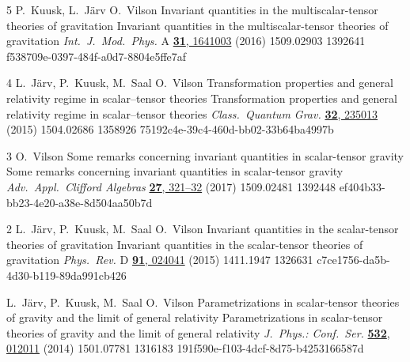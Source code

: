 
\lisaArtikkel%
	{5}%
	{P.\ Kuusk, L.\ J\"arv \ja{} O.\ Vilson}%
	{Invariant quantities in the multiscalar-tensor theories of gravitation}%
	{Invariant quantities in the multiscalar-tensor theories of gravitation}%
	{\textit{Int.\ J.\ Mod.\ Phys.} A \href{http://dx.doi.org/10.1142/S0217751X16410037}{{\bf 31}, 1641003} (2016)}%
	{1509.02903}%
	{1392641}%
	{f538709e-0397-484f-a0d7-8804e5ffe7af} %


\lisaArtikkel%
	{4}%
	{L.\ J\"arv, P.\ Kuusk, M.\ Saal \ja{} O.\ Vilson}%
	{Transformation properties and general relativity regime in scalar–tensor theories}%
	{Transformation properties and general relativity regime in scalar–tensor theories}%
	{\textit{Class.\ Quantum Grav.} \href{https://doi.org/10.1088/0264-9381/32/23/235013}{{\bf 32}, 235013} (2015)}%
	{1504.02686}%
	{1358926}%
	{75192c4e-39c4-460d-bb02-33b64ba4997b} %


\lisaArtikkel%
	{3}%
	{O.\ Vilson}%
	{Some remarks concerning invariant quantities in scalar-tensor gravity}%
	{Some remarks concerning invariant quantities in scalar-tensor gravity}%
	{\textit{Adv.\ Appl.\ Clifford Algebras} 	\href{https://doi.org/10.1007/s00006-015-0567-4}{{\bf 27}, 321--32} (2017)}%
	{1509.02481}%
	{1392448}%
	{ef404b33-bb23-4e20-a38e-8d504aa50b7d} %


\lisaArtikkel%
	{2}%
	{L.\ J\"arv, P.\ Kuusk, M.\ Saal \ja{} O.\ Vilson}%
	{Invariant quantities in the scalar-tensor theories of gravitation}%
	{Invariant quantities in the scalar-tensor theories of gravitation}%
	{\textit{Phys.\ Rev.} D \href{https://doi.org/10.1103/PhysRevD.91.024041}{{\bf 91}, 024041} (2015)}%
	{1411.1947}%
	{1326631}%
	{c7ce1756-da5b-4d30-b119-89da991cb426} %


	{L.\ J\"arv, P.\ Kuusk, M.\ Saal \ja{} O.\ Vilson}%
	{Parametrizations in scalar-tensor theories of gravity and the limit of general relativity}%
	{Parametrizations in scalar-tensor theories of gravity and the limit of general relativity}%
	{\textit{J.\ Phys.: Conf.\ Ser.} \href{https://doi.org/10.1088/1742-6596/532/1/012011}{{\bf 532}, 012011} (2014)}%
	{1501.07781}%
	{1316183}%
	{191f590e-f103-4dcf-8d75-b4253166587d} %